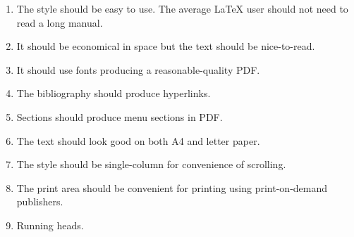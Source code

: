 \documentclass{easychair}
\begin{document}
\begin{enumerate}
\item
The style should be easy to use. 
The average {\LaTeX} user should not need to read a long manual.

\item
It should be economical in space but the text should be nice-to-read.

\item
It should use fonts producing a reasonable-quality PDF.

\item
The bibliography should produce hyperlinks.

\item
Sections should produce menu sections in PDF.

\item
The text should look good on both A4 and letter paper.

\item
The style should be single-column for convenience of scrolling.

\item
The print area should be convenient for printing using print-on-demand publishers.

\item
Running heads.
\end{enumerate}


\end{document}
